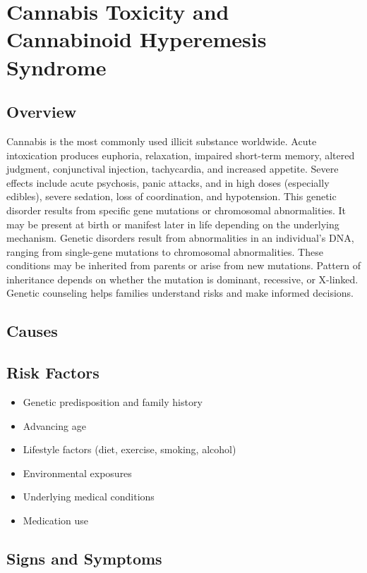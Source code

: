 \chapter{Cannabis Toxicity and Cannabinoid Hyperemesis Syndrome}
\label{sec:Cannabis Toxicity}

\section{Overview}
Cannabis is the most commonly used illicit substance worldwide. Acute intoxication produces euphoria, relaxation, impaired short-term memory, altered judgment, conjunctival injection, tachycardia, and increased appetite. Severe effects include acute psychosis, panic attacks, and in high doses (especially edibles), severe sedation, loss of coordination, and hypotension. This genetic disorder results from specific gene mutations or chromosomal abnormalities. It may be present at birth or manifest later in life depending on the underlying mechanism. Genetic disorders result from abnormalities in an individual's DNA, ranging from single-gene mutations to chromosomal abnormalities. These conditions may be inherited from parents or arise from new mutations. Pattern of inheritance depends on whether the mutation is dominant, recessive, or X-linked. Genetic counseling helps families understand risks and make informed decisions.
\section{Causes}
\section{Risk Factors}

\begin{itemize}[noitemsep]
  \item Genetic predisposition and family history
  \item Advancing age
  \item Lifestyle factors (diet, exercise, smoking, alcohol)
  \item Environmental exposures
  \item Underlying medical conditions
  \item Medication use
\end{itemize}
\section{Signs and Symptoms}

